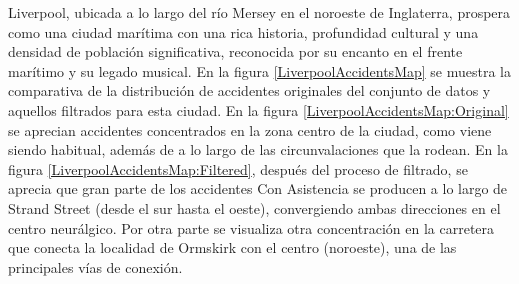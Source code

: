 Liverpool, ubicada a lo largo del río Mersey en el noroeste de Inglaterra, prospera como una ciudad marítima con una rica historia, profundidad cultural y una densidad de población significativa, reconocida por su encanto en el frente marítimo y su legado musical. En la figura \ref{LiverpoolAccidentsMap} se muestra la comparativa de la distribución de accidentes originales del conjunto de datos y aquellos filtrados para esta ciudad. En la figura \ref{LiverpoolAccidentsMap:Original} se aprecian accidentes concentrados en la zona centro de la ciudad, como viene siendo habitual, además de a lo largo de las circunvalaciones que la rodean. En la figura \ref{LiverpoolAccidentsMap:Filtered}, después del proceso de filtrado, se aprecia que gran parte de los accidentes Con Asistencia se producen a lo largo de Strand Street (desde el sur hasta el oeste), convergiendo ambas direcciones en el centro neurálgico. Por otra parte se visualiza otra concentración en la carretera que conecta la localidad de Ormskirk con el centro (noroeste), una de las principales vías de conexión.



